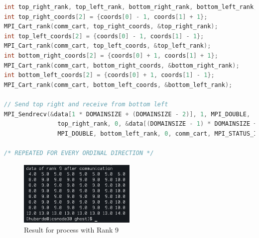 \begin{lstlisting}[language=C++, caption=Example, label=lst:ordinal]
int top_right_rank, top_left_rank, bottom_right_rank, bottom_left_rank;
int top_right_coords[2] = {coords[0] - 1, coords[1] + 1};
MPI_Cart_rank(comm_cart, top_right_coords, &top_right_rank);
int top_left_coords[2] = {coords[0] - 1, coords[1] - 1};
MPI_Cart_rank(comm_cart, top_left_coords, &top_left_rank);
int bottom_right_coords[2] = {coords[0] + 1, coords[1] + 1};
MPI_Cart_rank(comm_cart, bottom_right_coords, &bottom_right_rank);
int bottom_left_coords[2] = {coords[0] + 1, coords[1] - 1};
MPI_Cart_rank(comm_cart, bottom_left_coords, &bottom_left_rank);

// Send top right and receive from bottom left
MPI_Sendrecv(&data[1 * DOMAINSIZE + (DOMAINSIZE - 2)], 1, MPI_DOUBLE,
               top_right_rank, 0, &data[(DOMAINSIZE - 1) * DOMAINSIZE + 0], 1,
               MPI_DOUBLE, bottom_left_rank, 0, comm_cart, MPI_STATUS_IGNORE);

/* REPEATED FOR EVERY ORDINAL DIRECTION */
\end{lstlisting}

\begin{figure}[H]
	\centering
	\includegraphics[width=0.5\textwidth]{../media/ghost.png}
	\caption{Result for process with Rank 9}
	\label{fig:dgemm-fm}
\end{figure}


